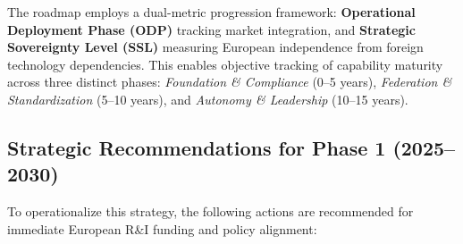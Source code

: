 \documentclass{ieeeaccess}
\begin{document}
The roadmap employs a dual-metric progression framework: \textbf{Operational Deployment
Phase (ODP)} tracking market integration, and \textbf{Strategic Sovereignty Level (SSL)}
measuring European independence from foreign technology dependencies. This enables objective
tracking of capability maturity across three distinct phases: \emph{Foundation \&
Compliance} (0--5 years), \emph{Federation \& Standardization} (5--10 years), and
\emph{Autonomy \& Leadership} (10--15 years).


\subsection*{Strategic Recommendations for Phase 1 (2025--2030)}
To operationalize this strategy, the following actions are recommended for immediate
European R\&I funding and policy alignment:
\end{document}
